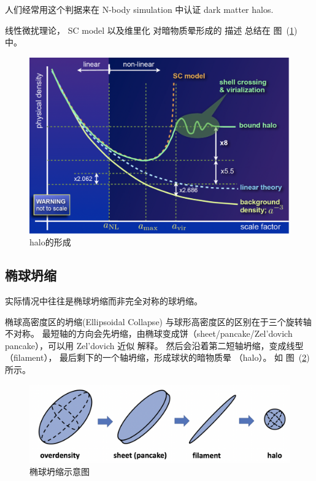 \documentclass[12pt]{ctexart}
\newcommand{\reffig}[1]{图~(\ref{#1})}
\begin{document}
人们经常用这个判据来在 N-body simulation 中认证 dark matter halos.

线性微扰理论， SC model 以及维里化 对暗物质晕形成的 描述 总结在 \reffig{fig:SC_model} 中。
\begin{figure}[!hbtp]
	\centering 
	\includegraphics[width=1.0\linewidth]{SC_model.png}
	\caption{halo的形成}
    \label{fig:SC_model}
\end{figure}



\subsection{椭球坍缩}
实际情况中往往是椭球坍缩而非完全对称的球坍缩。

椭球高密度区的坍缩(Ellipsoidal Collapse)
与球形高密度区的区别在于三个旋转轴不对称。
最短轴的方向会先坍缩，由椭球变成饼（sheet/pancake/Zel'dovich pancake），可以用 Zel'dovich 近似 解释。
然后会沿着第二短轴坍缩，变成线型 （filament），
最后剩下的一个轴坍缩，形成球状的暗物质晕 （halo）。 
如 \reffig{fig:Ellips_Colla} 所示。

\begin{figure}[!hbtp]
	\centering 
	\includegraphics[width=1.0\linewidth]{Ellips_Colla.png}
	\caption{椭球坍缩示意图}
    \label{fig:Ellips_Colla}
\end{figure}
\end{document}
